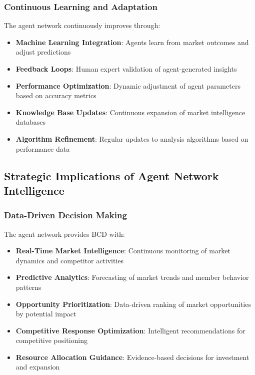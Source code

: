 \subsubsection{Continuous Learning and Adaptation}

The agent network continuously improves through:

\begin{itemize}
    \item \textbf{Machine Learning Integration}: Agents learn from market outcomes and adjust predictions
    \item \textbf{Feedback Loops}: Human expert validation of agent-generated insights
    \item \textbf{Performance Optimization}: Dynamic adjustment of agent parameters based on accuracy metrics
    \item \textbf{Knowledge Base Updates}: Continuous expansion of market intelligence databases
    \item \textbf{Algorithm Refinement}: Regular updates to analysis algorithms based on performance data
\end{itemize}

\subsection{Strategic Implications of Agent Network Intelligence}

\subsubsection{Data-Driven Decision Making}

The agent network provides BCD with:

\begin{itemize}
    \item \textbf{Real-Time Market Intelligence}: Continuous monitoring of market dynamics and competitor activities
    \item \textbf{Predictive Analytics}: Forecasting of market trends and member behavior patterns
    \item \textbf{Opportunity Prioritization}: Data-driven ranking of market opportunities by potential impact
    \item \textbf{Competitive Response Optimization}: Intelligent recommendations for competitive positioning
    \item \textbf{Resource Allocation Guidance}: Evidence-based decisions for investment and expansion
\end{itemize}

